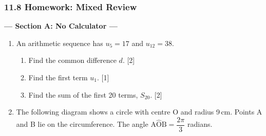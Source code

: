 \documentclass[12pt, twoside]{article}
\begin{document}
\subsubsection*{11.8 Homework: Mixed Review}

\begin{center}\textbf{--- Section A: No Calculator ---}\end{center}

\begin{enumerate}[itemsep=0.15cm]

\item[1.] [Maximum mark: 5]

An arithmetic sequence has $u_5 = 17$ and $u_{12} = 38$.

\begin{enumerate}[itemsep=0.1cm]
  \item Find the common difference $d$. \hfill [2]
  \item Find the first term $u_1$. \hfill [1]
  \item Find the sum of the first 20 terms, $S_{20}$. \hfill [2]
\end{enumerate}


\fancyhead[RO]{} %
\newpage

\item[2.] [Maximum mark: 5]

The following diagram shows a circle with centre O and radius 9\,cm.
Points A and B lie on the circumference. The angle
$\mathrm{A\hat{O}B} = \dfrac{2\pi}{3}$ radians.

\begin{center}
\end{center}
\vspace{-0.3cm}


\end{enumerate}
\end{document}
